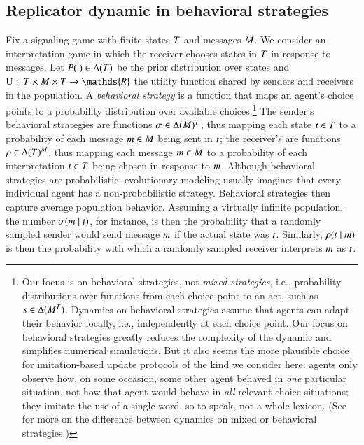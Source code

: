 \documentclass[fleqn,reqno,10pt]{article}
\renewcommand{\Pr}{\ensuremath{P}}
\begin{document}
\subsection{Replicator dynamic in behavioral strategies}
\label{sec:repl-dynam-behav}

Fix a signaling game with finite states $T$ and messages $M$. We consider an
interpretation game in which the receiver chooses states in $T$ in response to
messages. Let $\Pr(\cdot) \in \Delta(\States)$ be the prior distribution over states and
$\Util \mycolon \States \times \Messgs \times \States \rightarrow \mathds{R}$ the utility
function shared by senders and receivers in the population. A \emph{behavioral strategy} is a
function that maps an agent's choice points to a probability distribution over available
choices.\footnote{Our focus is on behavioral strategies, not \emph{mixed strategies}, i.e.,
  probability distributions over functions from each choice point to an act, such as
  $s \in \Delta(M^{T})$.  Dynamics on behavioral strategies assume that agents can
  adapt their behavior locally, i.e., independently at each choice point. Our focus on
  behavioral strategies greatly reduces the complexity of the dynamic and simplifies numerical
  simulations. But it also seems the more plausible choice for imitation-based update protocols
  of the kind we consider here: agents only observe how, on some occasion, some other agent
  behaved in \emph{one} particular situation, not how that agent would behave in \emph{all}
  relevant choice situations; they imitate the use of a single word, so to speak, not a whole
  lexicon. (See \citet{Cressman2003:Evolutionary-Dy} for more on the difference between
  dynamics on mixed or behavioral strategies.)} The sender's behavioral strategies are
functions $\sigma \in \Delta(M)^T$, thus mapping each state $t \in T$
to a probability of each message $m \in M$ being sent in $t$; the receiver's
are functions $\rho \in \Delta(T)^M$, thus mapping each message
$m \in M$ to a probability of each interpretation $t \in T$ being chosen
in response to $m$. Although behavioral strategies are probabilistic, evolutionary
modeling usually imagines that every individual agent has a non-probabilistic
strategy. Behavioral strategies then capture average population behavior. Assuming a virtually
infinite population, the number $\sigma(m \mid t)$, for instance, is then the
probability that a randomly sampled sender would send message $m$ if the actual state was
$t$. Similarly, $\rho(t \mid m)$ is then the probability with which a
randomly sampled receiver interprets $m$ as $t$.
\end{document}

